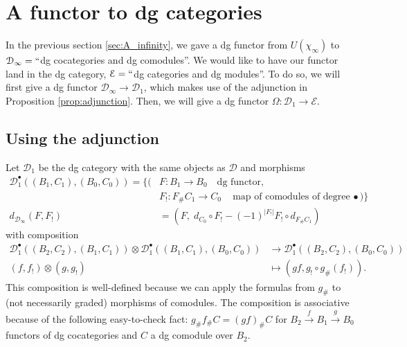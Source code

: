 \section{A functor to dg categories} \label{sec:cobar}
In the previous section \ref{sec:A_infinity},
we gave a dg functor from $U(\chi_\infty)$ 
to $\mathcal{D}_\infty = ``$dg cocategories 
and dg comodules''. We would like to have our 
functor land in the dg category, 
$\mathcal{E} = ``$dg categories and dg 
modules''. To do so, we will first give a 
dg functor $\mathcal{D}_\infty \to 
\mathcal{D}_1$, 
which makes use of the adjunction in 
Proposition \ref{prop:adjunction}. Then, 
we will give a dg functor $\Omega: 
\mathcal{D}_1 \to \mathcal{E}$.

\subsection{Using the adjunction}
\label{sec:use_adjunction}
Let $\mathcal{D}_1$ be the 
dg category with the same objects 
as $\mathcal{D}$ and morphisms
\begin{align*}
\mathcal{D}_1^\bullet(
  (B_1, C_1), (B_0,C_0))
= \big\{ \big(
& F: 
B_1 \to B_0 \quad \textrm{dg functor},\\
& F_!:
F_{\#}C_1 \to C_0 \quad \textrm{map of 
comodules of degree $\bullet$}
\big) \big\}\\
d_{\mathcal{D}_\infty}(F,F_!)
&=
(F,\; d_{C_0} \circ F_! - (-1)^{|F_!|} 
F_! \circ d_{F_\# C_1})
\end{align*}
with composition
\begin{align*}  
\mathcal{D}_1^\bullet(
  (B_2, C_2), (B_1, C_1)) \otimes  
  \mathcal{D}_1^\bullet(
  (B_1, C_1), (B_0, C_0))
&\to
\mathcal{D}_1^\bullet(
  (B_2, C_2), (B_0, C_0))\\
(f,f_!) \otimes (g, g_!)
&\mapsto
(gf, g_!\circ g_\#(f_!)).
\end{align*}
This composition is well-defined because 
we can apply the formulas from $g_\#$ to 
(not necessarily graded) morphisms of 
comodules. The composition is associative 
because of the following easy-to-check 
fact: $g_\#f_\#C = (gf)_\#C$ for 
$B_2 \xrightarrow{f} B_1 \xrightarrow{g} 
B_0$ functors of dg cocategories and $C$ 
a dg comodule over $B_2$.

